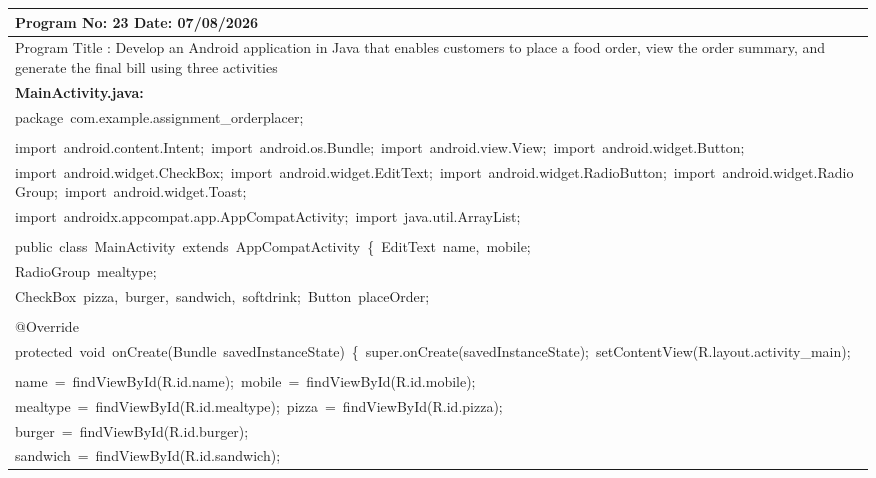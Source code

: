 \documentclass[a4paper,12pt]{article}
\begin{document}
\noindent\begingroup
\renewcommand{\arraystretch}{1.1}
\begin{longtable}{|p{}|}
\hline\endfirsthead\hline\endhead\hline\endfoot\hline\endlastfoot
\rule{0pt}{13pt}Program No: 23 \hfill Date: 07/08/2026 \\
\hline
\rule{0pt}{13pt}Program Title : Develop an Android application in Java that enables customers to place a food order, view the order summary, and generate the final bill using three activities \\
\hline
\rule{0pt}{13pt}\textbf{MainActivity.java:} \\
\hline
{\ttfamily\small package\ com.example.assignment\_orderplacer;} \\
\strut \\
{\ttfamily\small import\ android.content.Intent;\ import\ android.os.Bundle;\ import\ android.view.View;\ import\ android.widget.Button;} \\
{\ttfamily\small import\ android.widget.CheckBox;\ import\ android.widget.EditText;\ import\ android.widget.RadioButton;\ import\ android.widget.RadioGroup;\ import\ android.widget.Toast;} \\
{\ttfamily\small import\ androidx.appcompat.app.AppCompatActivity;\ import\ java.util.ArrayList;} \\
\strut \\
{\ttfamily\small public\ class\ MainActivity\ extends\ AppCompatActivity\ \{\ EditText\ name,\ mobile;} \\
{\ttfamily\small RadioGroup\ mealtype;} \\
{\ttfamily\small CheckBox\ pizza,\ burger,\ sandwich,\ softdrink;\ Button\ placeOrder;} \\
\strut \\
{\ttfamily\small @Override} \\
{\ttfamily\small protected\ void\ onCreate(Bundle\ savedInstanceState)\ \{\ super.onCreate(savedInstanceState);\ setContentView(R.layout.activity\_main);} \\
\strut \\
{\ttfamily\small name\ =\ findViewById(R.id.name);\ mobile\ =\ findViewById(R.id.mobile);} \\
{\ttfamily\small mealtype\ =\ findViewById(R.id.mealtype);\ pizza\ =\ findViewById(R.id.pizza);} \\
{\ttfamily\small burger\ =\ findViewById(R.id.burger);} \\
{\ttfamily\small sandwich\ =\ findViewById(R.id.sandwich);} \\

\end{longtable}
\end{document}
